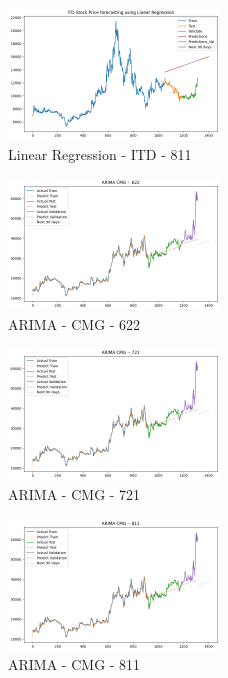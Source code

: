 \documentclass{ieeeojies}
\begin{document}
\begin{figure} [H]
    \centering
    \includegraphics[width=0.5\textwidth]{bibliography/Figure/LinearRegression_ITD_811_90.png}
    \caption{Linear Regression - ITD - 811}
    \label{fig:LR_ITD_811_90}
\end{figure}
\begin{figure} [H]
    \centering
    \includegraphics[width=0.5\textwidth]{bibliography/Figure/ARIMA_CMG_622_90.png}
    \caption{ARIMA - CMG - 622}
    \label{fig:ARIMA_CMG_622_90}
\end{figure}
\begin{figure} [H]
    \centering
    \includegraphics[width=0.5\textwidth]{bibliography/Figure/ARIMA_CMG_721_90.png}
    \caption{ARIMA - CMG - 721}
    \label{fig:ARIMA_CMG_721_90}
\end{figure}
\begin{figure} [H]
    \centering
    \includegraphics[width=0.5\textwidth]{bibliography/Figure/ARIMA_CMG_811_90.png}
    \caption{ARIMA - CMG - 811}
    \label{fig:ARIMA_CMG_811_90}
\end{figure}
\end{document}
